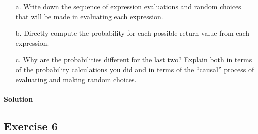 \begin{itemize}
    \item[a.] Write down the sequence of expression evaluations and random choices that will be made in evaluating each expression.
    \item[b.] Directly compute the probability for each possible return value from each expression.
    \item[c.] Why are the probabilities different for the last two? Explain both in terms of the probability calculations 
        you did and in terms of the “causal” process of evaluating and making random choices.
\end{itemize}

\paragraph{Solution}


\subsection*{Exercise 6}